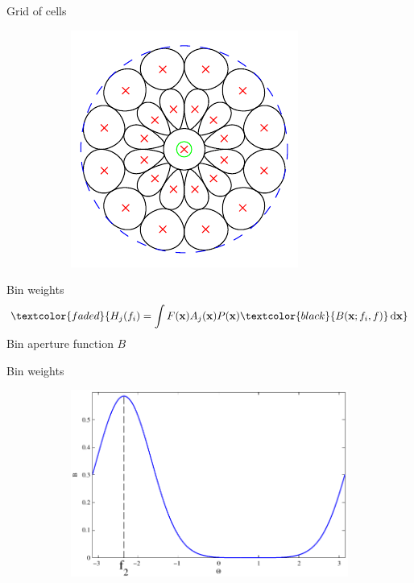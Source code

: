 \documentclass[14pt,t]{beamer}
\def\x{\mathbf{x}}
\begin{document}
\begin{frame}{Grid of cells}
\begin{figure}
\centering
	\begin{subfigure}[t]{0.7\textwidth}
		\includegraphics[width=\textwidth]{../defence/img/gridExample.pdf}
	\end{subfigure}
\end{figure}
\end{frame}
%
\begin{frame}{Bin weights}
\begin{align*}
\textcolor{faded}{H_j(f_i) = \int F(\x) A_j (\x) P (\x) \textcolor{black}{B(\x; f_i,f)} \,\text{d} \x}
\end{align*}
Bin aperture function $B$
\end{frame}
%
\begin{frame}{Bin weights}
\begin{figure}
\centering
	\begin{subfigure}[t]{1\textwidth}
		\includegraphics[width=\textwidth]{../defence/img/binExample.pdf}
	\end{subfigure}
\end{figure}
\end{frame}
\end{document}
